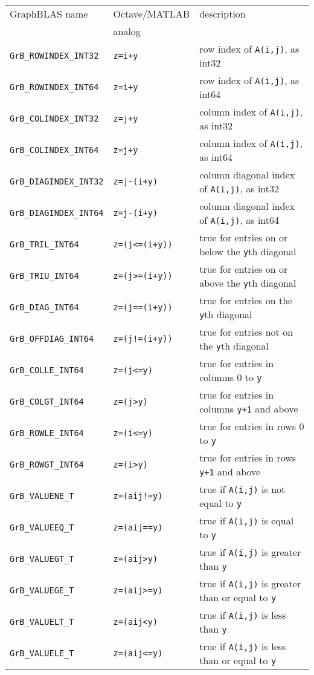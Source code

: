 \documentclass[12pt]{article}
\begin{document}
\vspace{0.2in}
\noindent
{\footnotesize
\begin{tabular}{lll}
\hline
GraphBLAS name          & Octave/MATLAB     & description \\
                        & analog            & \\
\hline
\verb'GrB_ROWINDEX_INT32'  & \verb'z=i+y'       & row index of \verb'A(i,j)', as int32 \\
\verb'GrB_ROWINDEX_INT64'  & \verb'z=i+y'       & row index of \verb'A(i,j)', as int64 \\
\verb'GrB_COLINDEX_INT32'  & \verb'z=j+y'       & column index of \verb'A(i,j)', as int32 \\
\verb'GrB_COLINDEX_INT64'  & \verb'z=j+y'       & column index of \verb'A(i,j)', as int64 \\
\verb'GrB_DIAGINDEX_INT32' & \verb'z=j-(i+y)'   & column diagonal index of \verb'A(i,j)', as int32 \\
\verb'GrB_DIAGINDEX_INT64' & \verb'z=j-(i+y)'   & column diagonal index of \verb'A(i,j)', as int64 \\
\hline
\verb'GrB_TRIL_INT64'    & \verb'z=(j<=(i+y))'  & true for entries on or below the \verb'y'th diagonal \\
\verb'GrB_TRIU_INT64'    & \verb'z=(j>=(i+y))'  & true for entries on or above the \verb'y'th diagonal \\
\verb'GrB_DIAG_INT64'    & \verb'z=(j==(i+y))'  & true for entries on the \verb'y'th diagonal \\
\verb'GrB_OFFDIAG_INT64' & \verb'z=(j!=(i+y))'  & true for entries not on the \verb'y'th diagonal \\
\verb'GrB_COLLE_INT64'   & \verb'z=(j<=y)'      & true for entries in columns 0 to \verb'y' \\
\verb'GrB_COLGT_INT64'   & \verb'z=(j>y)'       & true for entries in columns \verb'y+1' and above \\
\verb'GrB_ROWLE_INT64'   & \verb'z=(i<=y)'      & true for entries in rows 0 to \verb'y' \\
\verb'GrB_ROWGT_INT64'   & \verb'z=(i>y)'       & true for entries in rows \verb'y+1' and above \\
\hline
\verb'GrB_VALUENE_T'     & \verb'z=(aij!=y)'    & true if \verb'A(i,j)' is not equal to \verb'y'\\
\verb'GrB_VALUEEQ_T'     & \verb'z=(aij==y)'    & true if \verb'A(i,j)' is equal to \verb'y'\\
\verb'GrB_VALUEGT_T'     & \verb'z=(aij>y)'     & true if \verb'A(i,j)' is greater than \verb'y' \\
\verb'GrB_VALUEGE_T'     & \verb'z=(aij>=y)'    & true if \verb'A(i,j)' is greater than or equal to \verb'y' \\
\verb'GrB_VALUELT_T'     & \verb'z=(aij<y)'     & true if \verb'A(i,j)' is less than \verb'y' \\
\verb'GrB_VALUELE_T'     & \verb'z=(aij<=y)'    & true if \verb'A(i,j)' is less than or equal to \verb'y' \\
%
\hline
\end{tabular}
}
\vspace{0.2in}
\end{document}
